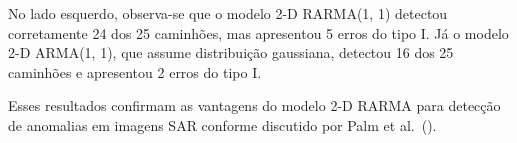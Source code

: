 \documentclass[
]{article}
\begin{document}
No lado esquerdo, observa-se que o modelo 2-D RARMA(1, 1) detectou corretamente 24 dos 25 caminhões, mas apresentou 5 erros do tipo I. Já o modelo 2-D ARMA(1, 1), que assume distribuição gaussiana, detectou 16 dos 25 caminhões e apresentou 2 erros do tipo I.

Esses resultados confirmam as vantagens do modelo 2-D RARMA para detecção de anomalias em imagens SAR conforme discutido por Palm et al.~(\citet{Palm2022}).

\renewcommand\refname{Referências}
  
\end{document}
